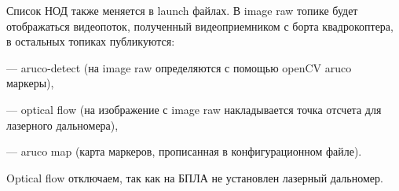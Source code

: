 Список НОД также меняется в launch файлах. В image raw топике будет отображаться видеопоток, полученный видеоприемником с борта квадрокоптера, в остальных топиках публикуются:

--- aruco-detect (на image raw определяются с помощью openCV aruco маркеры),

--- optical flow (на изображение с image raw накладывается точка отсчета для лазерного дальномера),

--- aruco map (карта маркеров, прописанная в конфигурационном файле).

Optical flow отключаем, так как на БПЛА не установлен лазерный дальномер.
